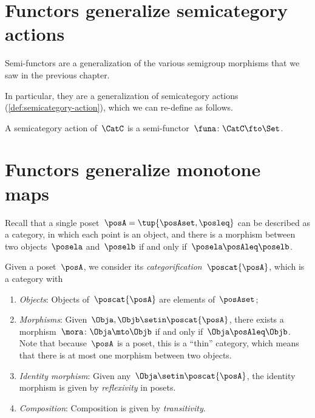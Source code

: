 
\section[\dots as semicategory actions]{Functors generalize semicategory actions}


Semi-functors are a generalization of the various semigroup morphisms that we saw in the previous chapter.


In particular, they are a generalization of semicategory actions (\cref{def:semicategory-action}), which we can re-define as follows.

\begin{ctdefinition}
    A semicategory action of~$\CatC$ is a semi-functor~$\funa\colon \CatC \fto \Set$.
\end{ctdefinition}

\section[\dots as monotone maps]{Functors generalize monotone maps}
\label{sec:posetsarecats}


Recall that a single poset~$\posA=\tup{\posAset, \posleq}$ can be described as a category, in which each point is an object, and there is a morphism between two objects~$\posela$ and~$\poselb$ if and only if~$\posela \posAleq \poselb$.

\begin{ctdefinition}
    Given a poset~$\posA$, we consider its \emph{categorification}~$\poscat{\posA}$, which is a category with
    \begin{enumerate}
        \item \emph{Objects}: Objects of~$\poscat{\posA}$ are elements of~$\posAset$;
        \item \emph{Morphisms}: Given~$\Obja,\Objb\setin \poscat{\posA}$, there exists a morphism~$\mora\colon \Obja\mto \Objb$ if and only if~$\Obja \posAleq \Objb$.
              Note that because~$\posA$ is a poset, this is a ``thin'' category, which means that there is at most one morphism between two objects.
        \item \emph{Identity morphism}: Given any~$\Obja \setin \poscat{\posA}$, the identity morphism is given by \emph{reflexivity} in posets.
        \item \emph{Composition}: Composition is given by \emph{transitivity}.
    \end{enumerate}
\end{ctdefinition}

